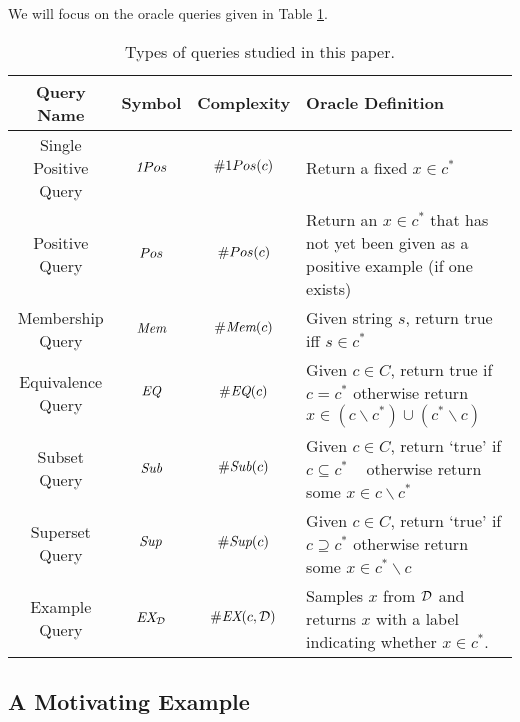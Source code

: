 We will focus on the oracle queries given in Table \ref{table:queries}.

\begin{table}
\label{table:queries}
\begin{center}
  \begin{tabularx}{\textwidth}{| c | c | c | X | }
    \hline
    Query Name & Symbol & Complexity & Oracle Definition \\ \hline
    Single Positive Query & $\emph{1}Pos$ & $\oneposC(c)$ & Return a fixed $x \in c^*$ \\ \hline
    Positive Query & $Pos$ & $\#Pos(c)$ & Return an $x\in c^*$ that has not yet been given as a positive example (if one exists)\\ \hline
    Membership Query & $\emph{Mem}$ & $\#\emph{Mem}(c)$ & Given string $s$, return true iff $s \in c^*$ \\ \hline
    Equivalence Query & $\emph{EQ}$ & $\#\emph{EQ}(c)$ & Given $c \in C$, return true if $c=c^*$ otherwise return $x \in (c \backslash c^*) \cup (c^* \backslash c)$\\ \hline 
    Subset Query & $\emph{Sub}$ & $\#\emph{Sub}(c)$ & Given $c \in C$, return `true' if $c \subseteq c^*$ \mbox{  } otherwise return some $x \in c \backslash c^*$ \\ \hline
    Superset Query & $\emph{Sup}$ & $\#\emph{Sup}(c)$ & Given $c \in C$, return `true' if $c \supseteq c^*$  otherwise return some $x \in c^* \backslash c$\\ \hline
    Example Query & $\emph{EX}_{\mathcal{D}}$ & $\#\emph{EX}(c, \mathcal{D})$ & Samples $x$ from $\mathcal{D}$ and returns $x$ with a label indicating whether $x \in c^*$. \\ \hline
  \end{tabularx}
\end{center}
\caption{Types of queries studied in this paper.}
\end{table}

\subsection{A Motivating Example}


